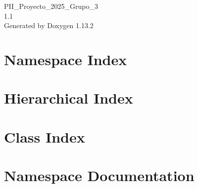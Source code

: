 \documentclass[twoside]{book}
\newcommand{\+}{\discretionary{\mbox{\scriptsize$\hookleftarrow$}}{}{}}
\newcommand{\clearemptydoublepage}{%
    \newpage{\pagestyle{empty}\cleardoublepage}%
  }
\begin{document}
  \raggedbottom
    \hypersetup{pageanchor=false,
                bookmarksnumbered=true,
                pdfencoding=unicode
               }
  \begin{titlepage}
  \vspace*{7cm}
  \begin{center}%
  {\Large PII\+\_\+\+Proyecto\+\_\+2025\+\_\+\+Grupo\+\_\+3}\\
  [1ex]\large 1.\+1 \\
  \vspace*{1cm}
  {\large Generated by Doxygen 1.13.2}\\
  \end{center}
  \end{titlepage}
  \clearemptydoublepage
  \tableofcontents
  \clearemptydoublepage
  \hypersetup{pageanchor=true}

\chapter{Namespace Index}

\chapter{Hierarchical Index}

\chapter{Class Index}

\chapter{Namespace Documentation}










\end{document}
